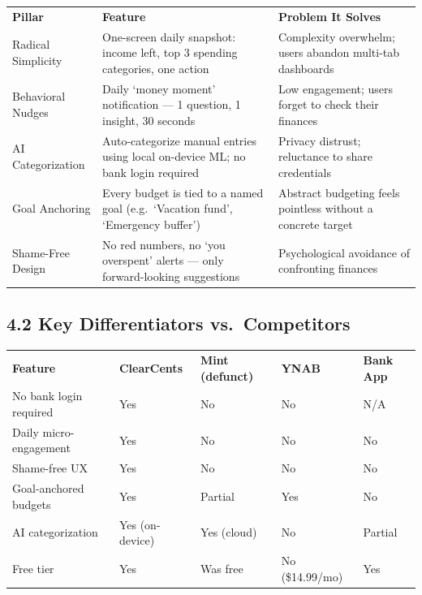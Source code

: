 \documentclass[11pt,a4paper]{article}
\begin{document}
\vspace{0.5em}
\begin{tabularx}{\textwidth}{L{3cm} L{5.5cm} L{6.5cm}}
\color{white}\textbf{Pillar} & \color{white}\textbf{Feature} & \color{white}\textbf{Problem It Solves} \\
Radical Simplicity &
  One-screen daily snapshot: income left, top 3 spending categories, one action &
  Complexity overwhelm; users abandon multi-tab dashboards \\
Behavioral Nudges &
  Daily `money moment' notification --- 1 question, 1 insight, 30 seconds &
  Low engagement; users forget to check their finances \\
AI Categorization &
  Auto-categorize manual entries using local on-device ML; no bank login required &
  Privacy distrust; reluctance to share credentials \\
Goal Anchoring &
  Every budget is tied to a named goal (e.g.\ `Vacation fund', `Emergency buffer') &
  Abstract budgeting feels pointless without a concrete target \\
Shame-Free Design &
  No red numbers, no `you overspent' alerts --- only forward-looking suggestions &
  Psychological avoidance of confronting finances \\
\end{tabularx}
\vspace{0.5em}

\subsection{4.2 Key Differentiators vs.\ Competitors}

\vspace{0.5em}
\begin{tabularx}{\textwidth}{L{4.5cm} C{2cm} C{2.5cm} C{2cm} C{2cm}}
\color{white}\textbf{Feature} &
\color{white}\textbf{ClearCents} &
\color{white}\textbf{Mint (defunct)} &
\color{white}\textbf{YNAB} &
\color{white}\textbf{Bank App} \\
No bank login required & Yes & No & No & N/A \\
Daily micro-engagement & Yes & No & No & No \\
Shame-free UX & Yes & No & No & No \\
Goal-anchored budgets & Yes & Partial & Yes & No \\
AI categorization & Yes (on-device) & Yes (cloud) & No & Partial \\
Free tier & Yes & Was free & No (\$14.99/mo) & Yes \\
\end{tabularx}
\vspace{0.5em}
\end{document}
